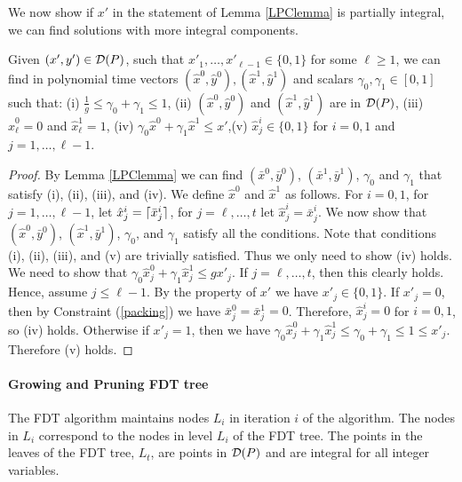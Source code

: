 We now show if $x'$ in the statement of Lemma \ref{LPClemma} is partially integral, we can find solutions with more integral components.
\begin{lemma}\label{round-up}
	Given $(x',y')\in \operatorname{\mathcal{D}}(P)$, such that $x'_1,\ldots,x'_{\ell-1}\in \{0,1\}$ for some $\ell\geq 1$, we can find in polynomial time vectors $(\hat{x}^0,\hat{y}^0),(\hat{x}^1,\hat{y}^1)$ and scalars $\gamma_0,\gamma_1 \in [0,1]$ such that: (i) $\frac{ 1}{g}\leq \gamma_0 + \gamma_1  \leq 1$, (ii) $(\hat{x}^0,\hat{y}^0)$ and $(\hat{x}^1,\hat{y}^1)$ are in  $\operatorname{\mathcal{D}}( P)$, (iii) $\hat{x}^0_\ell=0$ and $\hat{x}^1_\ell=1$, (iv) $ \gamma_0\hat{x}^0 +\gamma_1 \hat{x}^1 \leq
		x'$,(v) $\hat{x}^i_j\in \{0,1\}$ for $i=0,1$ and $j=1,\ldots,\ell-1$.
\end{lemma} 
\begin{proof}
	By Lemma \ref{LPClemma} we can find $(\bar{x}^0,\bar{y}^0)$, $(\bar{x}^1,\bar{y}^1)$, $\gamma_0$ and $\gamma_1$ that satisfy (i), (ii), (iii), and (iv). We define $\hat{x}^0$ and $\hat{x}^1$ as follows. For $i=0,1$, for $j=1,\ldots,\ell-1$, let $\hat{x}^i_j= \lceil\bar{x}^i_j\rceil$, for $j=\ell,\ldots,t$ let $\hat{x}^i_j = \bar{x}^i_j$. We now show that $(\hat{x}^0,\bar{y}^0)$, $(\hat{x}^1,\bar{y}^1)$, $\gamma_0$, and $\gamma_1$ satisfy all the conditions. Note that conditions (i), (ii), (iii), and (v) are trivially satisfied. Thus we only need to show (iv) holds. We need to show that $\gamma_0 \hat{x}^0_j+\gamma_1\hat{x}^1_j\leq gx'_j$. If $j=\ell,\ldots,t$, then this clearly holds. Hence, assume $j\leq \ell-1$. By the property of $x'$ we have $x'_j\in \{0,1\}$. If $x'_j= 0$, then by Constraint (\ref{packing}) we have $\bar{x}^0_j = \bar{x}^1_j=0$. Therefore, $\hat{x}^i_j=0$ for $i=0,1$, so (iv) holds. Otherwise if $x'_j = 1$, then we have
	$\gamma_0\hat{x}^0_j+\gamma_1\hat{x}^1_j\leq \gamma_0+\gamma_1\leq 1\leq x'_j.$ 
	Therefore (v) holds.
\end{proof}

\paragraph{Growing and Pruning FDT tree} The FDT algorithm maintains nodes $L_i$ in iteration $i$ of the algorithm. The nodes in $L_i$ correspond to the nodes in level $L_i$ of the FDT tree. The points in the leaves of the FDT tree, $L_t$, are points in $\operatorname{\mathcal{D}}(P)$ and are integral for all integer variables.



